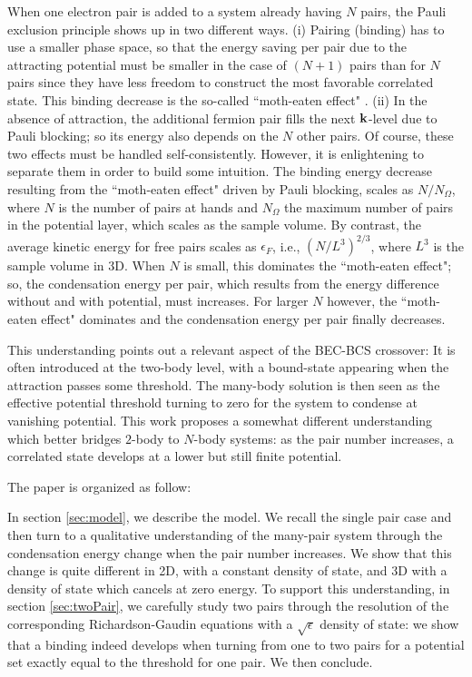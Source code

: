 \documentclass[5p,twocolumn]{elsarticle}
\begin{document}
When one electron pair is added to a system already having $N$ pairs, the Pauli exclusion principle shows up in two different ways.  (i) Pairing (binding) has to use a smaller phase space, so that the energy saving per pair due to the attracting potential must be smaller in the case of $(N+1)$ pairs than for $N$ pairs since they have less freedom to construct the most favorable correlated state.   This binding decrease is the so-called ``moth-eaten effect" \cite{moth}. (ii) In the absence of attraction, the additional fermion pair fills the next $\mathbf{k}$-level due to Pauli blocking; so its energy also depends on the $N$ other pairs.  Of course, these two effects must be handled self-consistently. However, it is enlightening to separate them in order to build some intuition. The binding energy decrease resulting from the ``moth-eaten effect" driven by Pauli blocking, scales as $N/N_\Omega$, where $N$ is the number of pairs at hands and $N_\Omega$ the maximum number of pairs in the potential layer, which scales as the sample volume. By contrast, the average kinetic energy for free pairs scales as $\epsilon_F$, i.e., $(N/L^3)^{2/3}$, where $L^{3}$ is the sample volume in 3D. 
When $N$ is small, this dominates the ``moth-eaten effect"; so, the condensation energy per pair, which results from the energy difference without and with potential, must increases.  For larger $N$ however, the ``moth-eaten effect" dominates and the condensation energy per pair finally decreases.

This understanding points out a relevant aspect of the BEC-BCS crossover:  It is often introduced at the two-body level, with a bound-state appearing when the attraction passes some threshold. The many-body solution is then seen as the effective potential threshold turning to zero for the system to condense at vanishing potential. This work proposes a somewhat different understanding which better bridges $2$-body to $N$-body systems: as the pair number increases, a correlated state develops at a lower but still finite potential.

The paper is organized as follow:

In section \ref{sec:model}, we describe the model. We recall the single pair case and then turn to a qualitative understanding of the many-pair system through the condensation energy change when the pair number increases. We show that this change is quite different in 2D, with a constant density of state, and 3D  with a density of state which cancels at zero energy.  To support this understanding, in section \ref{sec:twoPair}, we carefully study two pairs through the resolution of the corresponding  Richardson-Gaudin equations with a $\sqrt{\epsilon}$ density of state: we show that  a binding indeed develops when turning from one to two pairs for a potential set exactly equal to the threshold for one pair. We then conclude.
\end{document}
